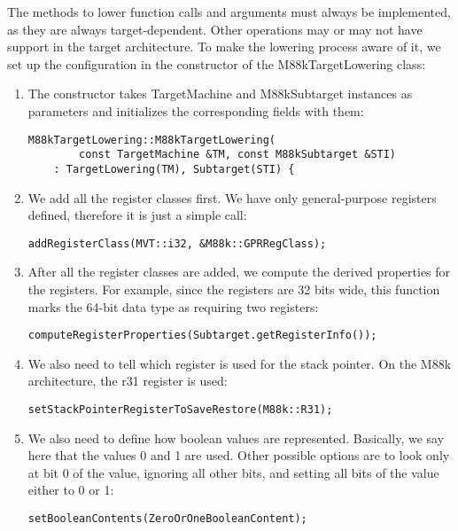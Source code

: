 The methods to lower function calls and arguments must always be implemented, as they are always target-dependent. Other operations may or may not have support in the target architecture. To make the lowering process aware of it, we set up the configuration in the constructor of the M88kTargetLowering class:\par

\begin{enumerate}
\item The constructor takes TargetMachine and M88kSubtarget instances as parameters and initializes the corresponding fields with them:
\begin{lstlisting}[caption={}]
M88kTargetLowering::M88kTargetLowering(
		const TargetMachine &TM, const M88kSubtarget &STI)
	: TargetLowering(TM), Subtarget(STI) {
\end{lstlisting}

\item We add all the register classes first. We have only general-purpose registers defined, therefore it is just a simple call:
\begin{lstlisting}[caption={}]
	addRegisterClass(MVT::i32, &M88k::GPRRegClass);
\end{lstlisting}

\item After all the register classes are added, we compute the derived properties for the registers. For example, since the registers are 32 bits wide, this function marks the 64-bit data type as requiring two registers:
\begin{lstlisting}[caption={}]
	computeRegisterProperties(Subtarget.getRegisterInfo());
\end{lstlisting}

\item We also need to tell which register is used for the stack pointer. On the M88k architecture, the r31 register is used:
\begin{lstlisting}[caption={}]
	setStackPointerRegisterToSaveRestore(M88k::R31);
\end{lstlisting}

\item We also need to define how boolean values are represented. Basically, we say here that the values 0 and 1 are used. Other possible options are to look only at bit 0 of the value, ignoring all other bits, and setting all bits of the value either to 0 or 1:
\begin{lstlisting}[caption={}]
	setBooleanContents(ZeroOrOneBooleanContent);
\end{lstlisting}


\end{enumerate}
